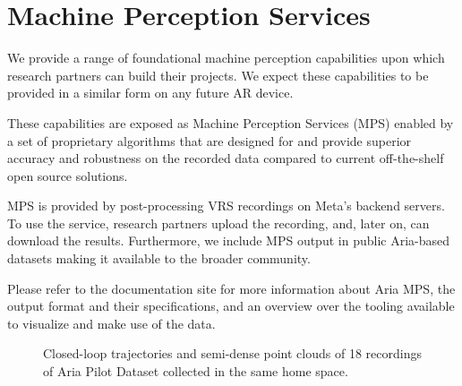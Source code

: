 \section{Machine Perception Services}
\label{sec:mps}

We provide a range of foundational machine perception capabilities upon which research partners can build their projects. We expect these capabilities to be provided in a similar form on any future AR device.

These capabilities are exposed as Machine Perception Services (MPS) enabled by a set of proprietary algorithms that are designed for \AriaDevices{} and provide superior accuracy and robustness on the recorded data compared to current off-the-shelf open source solutions.


MPS is provided by post-processing VRS recordings on Meta's backend servers. To use the service, \ProjectAria research partners upload the recording, and, later on, can download the results. Furthermore, we include MPS output in public Aria-based datasets making it available to the broader community. 

Please refer to the \ProjectAria{} documentation site \cite{ariadocs} for more information about Aria MPS, the output format and their specifications, and an overview over the tooling available to visualize and make use of the data.


\begin{figure}[t]
    \centering
{\setlength{\fboxsep}{0pt}%
\setlength{\fboxrule}{0.5pt}%
}
    \caption{Closed-loop trajectories and semi-dense point clouds of 18 recordings of Aria Pilot Dataset \cite{ariapilot} collected in the same home space.}
    \label{fig:mps_static}
\end{figure}


